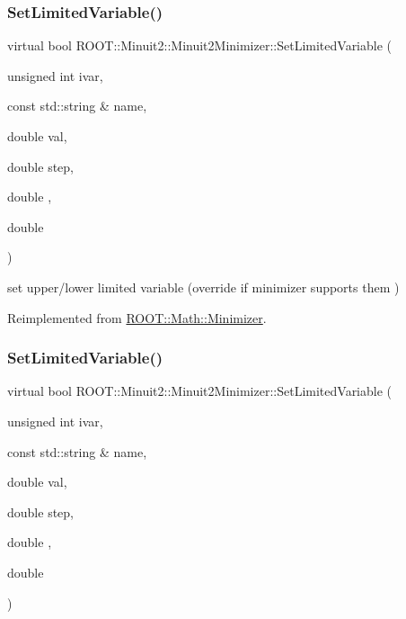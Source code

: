 \subsubsection{\texorpdfstring{SetLimitedVariable()}{SetLimitedVariable()}\hspace{0.1cm}{\footnotesize\ttfamily [2/3]}}
{\footnotesize\ttfamily virtual bool R\+O\+O\+T\+::\+Minuit2\+::\+Minuit2\+Minimizer\+::\+Set\+Limited\+Variable (\begin{DoxyParamCaption}\item[{unsigned int}]{ivar,  }\item[{const std\+::string \&}]{name,  }\item[{double}]{val,  }\item[{double}]{step,  }\item[{double}]{,  }\item[{double}]{ }\end{DoxyParamCaption})\hspace{0.3cm}{\ttfamily [virtual]}}



set upper/lower limited variable (override if minimizer supports them ) 



Reimplemented from \mbox{\hyperlink{classROOT_1_1Math_1_1Minimizer_a4303530cbb62ceb7cf9c9ebcbde530c2}{R\+O\+O\+T\+::\+Math\+::\+Minimizer}}.

\mbox{\label{classROOT_1_1Minuit2_1_1Minuit2Minimizer_a30385295df6a6b784aa59de7f00e4d23}} 
\subsubsection{\texorpdfstring{SetLimitedVariable()}{SetLimitedVariable()}\hspace{0.1cm}{\footnotesize\ttfamily [3/3]}}
{\footnotesize\ttfamily virtual bool R\+O\+O\+T\+::\+Minuit2\+::\+Minuit2\+Minimizer\+::\+Set\+Limited\+Variable (\begin{DoxyParamCaption}\item[{unsigned int}]{ivar,  }\item[{const std\+::string \&}]{name,  }\item[{double}]{val,  }\item[{double}]{step,  }\item[{double}]{,  }\item[{double}]{ }\end{DoxyParamCaption})\hspace{0.3cm}{\ttfamily [virtual]}}




